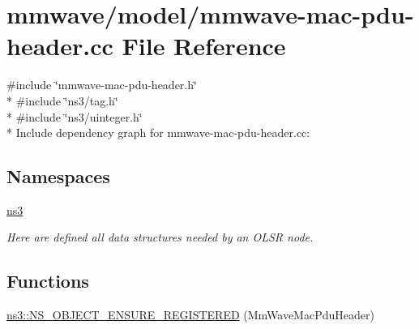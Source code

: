 \hypertarget{mmwave-mac-pdu-header_8cc}{}\section{mmwave/model/mmwave-\/mac-\/pdu-\/header.cc File Reference}
\label{mmwave-mac-pdu-header_8cc}
{\ttfamily \#include \char`\"{}mmwave-\/mac-\/pdu-\/header.\+h\char`\"{}}\\*
{\ttfamily \#include \char`\"{}ns3/tag.\+h\char`\"{}}\\*
{\ttfamily \#include \char`\"{}ns3/uinteger.\+h\char`\"{}}\\*
Include dependency graph for mmwave-\/mac-\/pdu-\/header.cc\+:
\subsection*{Namespaces}
\begin{DoxyCompactItemize}
\item 
 \hyperlink{namespacens3}{ns3}
\begin{DoxyCompactList}\small\item\em Here are defined all data structures needed by an O\+L\+SR node. \end{DoxyCompactList}\end{DoxyCompactItemize}
\subsection*{Functions}
\begin{DoxyCompactItemize}
\item 
\hyperlink{namespacens3_a844ac0a02841f3f3c7ed5a75d2d6f7ac}{ns3\+::\+N\+S\+\_\+\+O\+B\+J\+E\+C\+T\+\_\+\+E\+N\+S\+U\+R\+E\+\_\+\+R\+E\+G\+I\+S\+T\+E\+R\+ED} (Mm\+Wave\+Mac\+Pdu\+Header)
\end{DoxyCompactItemize}
